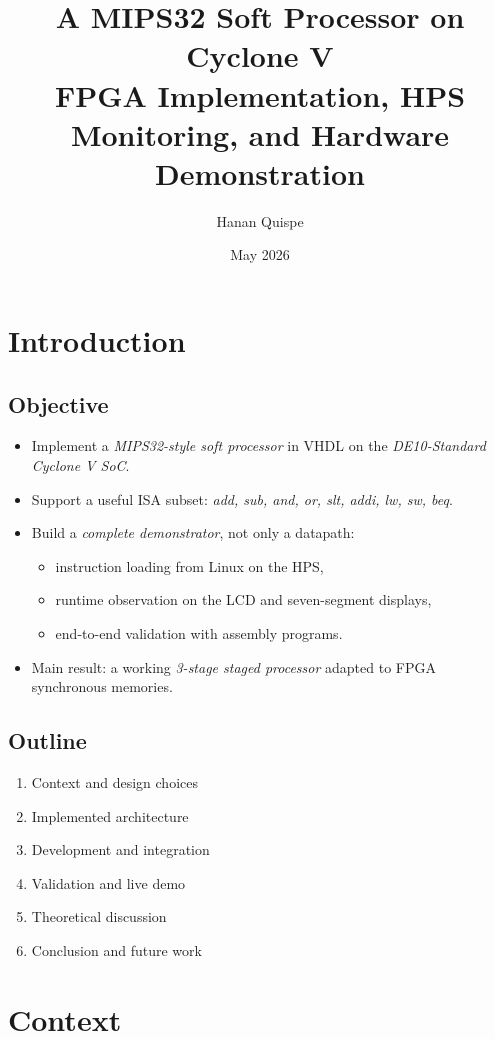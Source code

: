 \documentclass[11pt]{article}
\author{Hanan Quispe}
\date{May 2026}
\title{A MIPS32 Soft Processor on Cyclone V\\\medskip
\large FPGA Implementation, HPS Monitoring, and Hardware Demonstration}
\begin{document}
\maketitle

\section*{Introduction}
\label{sec:org374b58e}
\subsection*{Objective}
\label{sec:org3e61dec}
\begin{itemize}
\item Implement a \emph{MIPS32-style soft processor} in VHDL on the \emph{DE10-Standard Cyclone V SoC}.
\item Support a useful ISA subset: \emph{add, sub, and, or, slt, addi, lw, sw, beq}.
\item Build a \emph{complete demonstrator}, not only a datapath:
\begin{itemize}
\item instruction loading from Linux on the HPS,
\item runtime observation on the LCD and seven-segment displays,
\item end-to-end validation with assembly programs.
\end{itemize}
\item Main result: a working \emph{3-stage staged processor} adapted to FPGA synchronous memories.
\end{itemize}
\subsection*{Outline}
\label{sec:orgc20ebf7}
\begin{enumerate}
\item Context and design choices
\item Implemented architecture
\item Development and integration
\item Validation and live demo
\item Theoretical discussion
\item Conclusion and future work
\end{enumerate}
\section*{Context}
\label{sec:org56d2aea}
\end{document}
